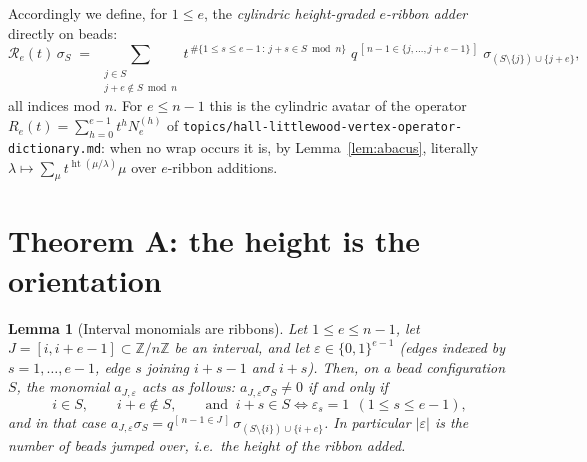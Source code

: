 \documentclass[11pt]{article}
\theoremstyle{plain}
\newtheorem{lemma}[theorem]{Lemma}
\theoremstyle{definition}
\newcommand{\ZZ}{\mathbb{Z}}
\DeclareMathOperator{\hgt}{ht}
\begin{document}
Accordingly we define, for $1\le e$, the \emph{cylindric height-graded
$e$-ribbon adder} directly on beads:
\begin{equation}\label{eq:ribbondef}
\mathcal R_e(t)\,\sigma_S \;=\;
\sum_{\substack{j\in S\\ j+e\notin S \bmod n}}
t^{\,\#\{1\le s\le e-1\,:\,j+s\in S \bmod n\}}\;
q^{\,[\,n-1\in\{j,\dots,j+e-1\}\,]}\;
\sigma_{(S\setminus\{j\})\cup\{j+e\}},
\end{equation}
all indices mod $n$.  For $e\le n-1$ this is the cylindric avatar of the
operator $R_e(t)=\sum_{h=0}^{e-1}t^hN_e^{(h)}$ of
\texttt{topics/hall-littlewood-vertex-operator-dictionary.md}: when no
wrap occurs it is, by Lemma~\ref{lem:abacus}, literally $\lambda\mapsto
\sum_\mu t^{\hgt(\mu/\lambda)}\mu$ over $e$-ribbon additions.

\section{Theorem A: the height is the orientation}\label{sec:heaps}

\begin{lemma}[Interval monomials are ribbons]\label{lem:run}
Let $1\le e\le n-1$, let $J=[i,i+e-1]\subset\ZZ/n\ZZ$ be an interval, and
let $\varepsilon\in\{0,1\}^{e-1}$ (edges indexed by
$s=1,\dots,e-1$, edge $s$ joining $i+s-1$ and $i+s$).  Then, on a bead
configuration $S$, the monomial $a_{J,\varepsilon}$ acts as follows:
$a_{J,\varepsilon}\sigma_S\ne 0$ if and only if
\begin{equation}\label{eq:pattern}
i\in S,\qquad i+e\notin S,\qquad
\text{and }\ i+s\in S\iff \varepsilon_s=1\ \ (1\le s\le e-1),
\end{equation}
and in that case
$a_{J,\varepsilon}\sigma_S=q^{[\,n-1\in J\,]}\,\sigma_{(S\setminus\{i\})\cup\{i+e\}}$.
In particular $|\varepsilon|$ is the number of beads jumped over, i.e.\
the height of the ribbon added.
\end{lemma}
\end{document}
